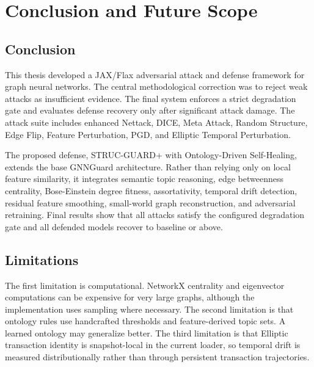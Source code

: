 \documentclass[12pt,oneside]{report}
\begin{document}
\chapter{Conclusion and Future Scope}

\section{Conclusion}
This thesis developed a JAX/Flax adversarial attack and defense framework for graph neural networks. The central methodological correction was to reject weak attacks as insufficient evidence. The final system enforces a strict degradation gate and evaluates defense recovery only after significant attack damage. The attack suite includes enhanced Nettack, DICE, Meta Attack, Random Structure, Edge Flip, Feature Perturbation, PGD, and Elliptic Temporal Perturbation.

The proposed defense, STRUC-GUARD+ with Ontology-Driven Self-Healing, extends the base GNNGuard architecture. Rather than relying only on local feature similarity, it integrates semantic topic reasoning, edge betweenness centrality, Bose-Einstein degree fitness, assortativity, temporal drift detection, residual feature smoothing, small-world graph reconstruction, and adversarial retraining. Final results show that all attacks satisfy the configured degradation gate and all defended models recover to baseline or above.

\section{Limitations}
The first limitation is computational. NetworkX centrality and eigenvector computations can be expensive for very large graphs, although the implementation uses sampling where necessary. The second limitation is that ontology rules use handcrafted thresholds and feature-derived topic sets. A learned ontology may generalize better. The third limitation is that Elliptic transaction identity is snapshot-local in the current loader, so temporal drift is measured distributionally rather than through persistent transaction trajectories.
\end{document}
